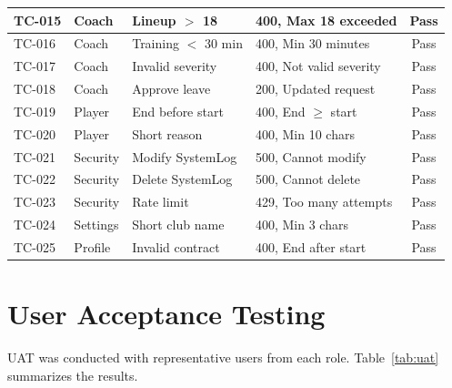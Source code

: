 \documentclass[12pt,a4paper,oneside]{report}
\begin{document}
\begin{longtable}{|l|l|p{4.5cm}|p{4.5cm}|c|}
\hline
TC-015 & Coach   & Lineup $>$ 18       & 400, Max 18 exceeded       & Pass \\
\hline\rowcolor{tableRow}
TC-016 & Coach   & Training $<$ 30 min & 400, Min 30 minutes        & Pass \\
\hline
TC-017 & Coach   & Invalid severity     & 400, Not valid severity    & Pass \\
\hline\rowcolor{tableRow}
TC-018 & Coach   & Approve leave        & 200, Updated request       & Pass \\
\hline
TC-019 & Player  & End before start     & 400, End $\geq$ start     & Pass \\
\hline\rowcolor{tableRow}
TC-020 & Player  & Short reason         & 400, Min 10 chars          & Pass \\
\hline
TC-021 & Security& Modify SystemLog     & 500, Cannot modify         & Pass \\
\hline\rowcolor{tableRow}
TC-022 & Security& Delete SystemLog     & 500, Cannot delete         & Pass \\
\hline
TC-023 & Security& Rate limit           & 429, Too many attempts     & Pass \\
\hline\rowcolor{tableRow}
TC-024 & Settings& Short club name      & 400, Min 3 chars           & Pass \\
\hline
TC-025 & Profile & Invalid contract     & 400, End after start       & Pass \\
\hline
\end{longtable}

\section{User Acceptance Testing}

UAT was conducted with representative users from each role. Table~\ref{tab:uat} summarizes the results.
\end{document}
